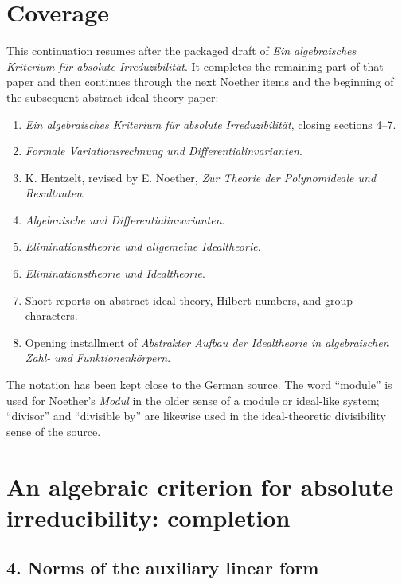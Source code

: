 \documentclass[12pt]{article}
\author{}
\date{}
\begin{document}
\maketitle

\tableofcontents
\newpage

\section*{Coverage}
This continuation resumes after the packaged draft of \emph{Ein algebraisches Kriterium f\"ur absolute Irreduzibilit\"at}. It completes the remaining part of that paper and then continues through the next Noether items and the beginning of the subsequent abstract ideal-theory paper:
\begin{enumerate}
  \item \emph{Ein algebraisches Kriterium f\"ur absolute Irreduzibilit\"at}, closing sections 4--7.
  \item \emph{Formale Variationsrechnung und Differentialinvarianten}.
  \item K. Hentzelt, revised by E. Noether, \emph{Zur Theorie der Polynomideale und Resultanten}.
  \item \emph{Algebraische und Differentialinvarianten}.
  \item \emph{Eliminationstheorie und allgemeine Idealtheorie}.
  \item \emph{Eliminationstheorie und Idealtheorie}.
  \item Short reports on abstract ideal theory, Hilbert numbers, and group characters.
  \item Opening installment of \emph{Abstrakter Aufbau der Idealtheorie in algebraischen Zahl- und Funktionenk\"orpern}.
\end{enumerate}
The notation has been kept close to the German source. The word ``module'' is used for Noether's \emph{Modul} in the older sense of a module or ideal-like system; ``divisor'' and ``divisible by'' are likewise used in the ideal-theoretic divisibility sense of the source.

\newpage

\section{An algebraic criterion for absolute irreducibility: completion}

\subsection*{4. Norms of the auxiliary linear form}
\end{document}
